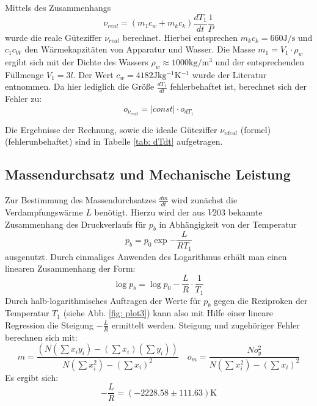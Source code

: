 Mittels des Zusammenhangs
\begin{equation}
  \nu_{real} = (m_1 c_w + m_k c_k) \frac{dT_1}{dt} \frac{1}{P}
\end{equation}
wurde die reale Güteziffer $\nu_{real}$ berechnet. Hierbei entsprechen $m_k c_k = 660 \si{\joule \per \second}$ und $c_1 c_W$ den Wärmekapzitäten von Apparatur und Wasser. Die Masse $m_1 = V_1 \cdot \rho_w$ ergibt sich mit
der Dichte des Wassers $\rho_w \approx 1000 \si{\kilo \gram \per \meter ^3}$ und der entsprechenden Füllmenge $V_1 = 3 l$. Der Wert $c_w = 4182\si{\joule \kilo \gram^{-1} \kelvin^{-1}}$ wurde der Literatur \cite{demtröder} entnommen.
Da hier lediglich die Größe $\frac{dT_1}{dt}$ fehlerbehaftet ist, berechnet sich der Fehler zu:
\begin{equation}
  o_{\nu_{real}} = \left| const \right| \cdot o_{dT_1}
  \label{eq: errorconst}
\end{equation}

Die Ergebnisse der Rechnung, sowie die ideale Güteziffer $\nu_{ideal}$ (formel) (fehlerunbehaftet) sind in Tabelle \ref{tab: dTdt} aufgetragen.


\subsection{Massendurchsatz und Mechanische Leistung}
Zur Bestimmung des Massendurchsatzes $\frac{dm}{dt}$ wird zunächst die Verdampfungswärme $L$ benötigt. Hierzu wird der aus $V203$ \cite{anleitung203} bekannte Zusammenhang des Druckverlaufs für $p_b$ in Abhängigkeit von der Temperatur
\begin{equation}
  p_b = p_0 \exp{-\frac{L}{R T_1}}
\end{equation}
ausgenutzt. Durch einmaliges Anwenden des Logarithmus erhält man einen linearen Zusammenhang der Form:
\begin{equation}
  \log{p_b} = \log{p_0} -\frac{L}{R} \cdot \frac{1}{T_1}
\end{equation}
Durch halb-logarithmisches Auftragen der Werte für $p_b$ gegen die Reziproken der Temperatur $T_1$ (siehe Abb. \ref{fig: plot3}) kann also mit Hilfe einer lineare Regression die Steigung $-\frac{L}{R}$ ermittelt werden.
Steigung und zugehöriger Fehler berechnen sich mit:
\begin{equation}
  m= \frac{\left( N  (\sum x_i y_i) - (\sum x_i)(\sum y_i)\right)}{N (\sum x_i^2)- (\sum x_i)^2 }    \quad   o_m=\frac{N o_y^2}{N (\sum x_i^2)- (\sum x_i)^2 }
\end{equation}
Es ergibt sich:
\begin{equation}
  -\frac{L}{R} =  (-2228.58 \pm 111.63) \si{\kelvin}
\end{equation}

